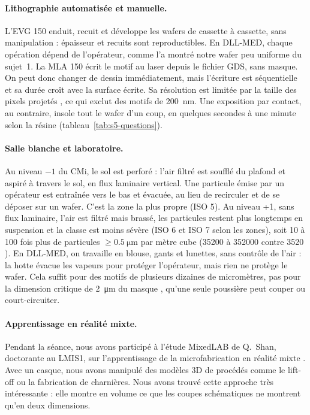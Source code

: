 \paragraph{Lithographie automatisée et manuelle.}
L'EVG 150 enduit, recuit et développe les wafers de cassette à cassette, sans manipulation : épaisseur et recuits sont reproductibles. En DLL-MED, chaque opération dépend de l'opérateur, comme l'a montré notre wafer peu uniforme du sujet~1. La MLA 150 écrit le motif au laser depuis le fichier GDS, sans masque. On peut donc changer de dessin immédiatement, mais l'écriture est séquentielle et sa durée croît avec la surface écrite. Sa résolution est limitée par la taille des pixels projetés \cite{mla}, ce qui exclut des motifs de \qty{200}{\nano\metre}. Une exposition par contact, au contraire, insole tout le wafer d'un coup, en quelques secondes à une minute selon la résine (tableau~\ref{tab:s5-questions}).

\paragraph{Salle blanche et laboratoire.}
Au niveau $-1$ du CMi, le sol est perforé : l'air filtré est soufflé du plafond et aspiré à travers le sol, en flux laminaire vertical. Une particule émise par un opérateur est entraînée vers le bas et évacuée, au lieu de recirculer et de se déposer sur un wafer. C'est la zone la plus propre (ISO 5). Au niveau +1, sans flux laminaire, l'air est filtré mais brassé, les particules restent plus longtemps en suspension et la classe est moins sévère (ISO 6 et ISO 7 selon les zones), soit 10 à 100 fois plus de particules $\geq \qty{0,5}{\micro\metre}$ par mètre cube (\num{35200} à \num{352000} contre \num{3520} \cite{cours303}). En DLL-MED, on travaille en blouse, gants et lunettes, sans contrôle de l'air : la hotte évacue les vapeurs pour protéger l'opérateur, mais rien ne protège le wafer. Cela suffit pour des motifs de plusieurs dizaines de micromètres, pas pour la dimension critique de \qty{2}{\micro\metre} du masque \cite{prot5}, qu'une seule poussière peut couper ou court-circuiter.

\paragraph{Apprentissage en réalité mixte.}
Pendant la séance, nous avons participé à l'étude MixedLAB de Q.~Shan, doctorante au LMIS1, sur l'apprentissage de la microfabrication en réalité mixte \cite{mixedlab}. Avec un casque, nous avons manipulé des modèles 3D de procédés comme le lift-off ou la fabrication de charnières. Nous avons trouvé cette approche très intéressante : elle montre en volume ce que les coupes schématiques ne montrent qu'en deux dimensions.

